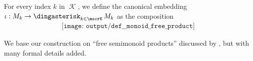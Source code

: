 \begin{definition}
  For every index \( k \) in \( \mscrK \), we define the canonical embedding \( \iota: M_k \to \Ast_{k \in \mscrK} M_k \) as the composition
  \begin{equation}\label{eq:def:monoid_free_product/embedding}
    \begin{aligned}
      \texttt{[image: output/def\_\_monoid\_free\_product]}
    \end{aligned}
  \end{equation}
\end{definition}
\begin{comments}
  \item We base our construction on \enquote{free semimonoid products} discussed by , but with many formal details added.
\end{comments}

